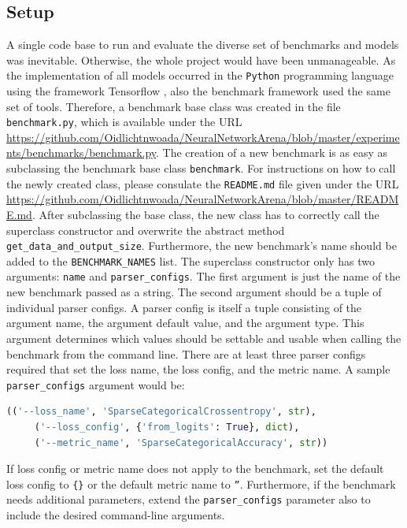 \documentclass[draft,final]{vutinfth} %
\begin{document}
    \subsection{Setup}
    A single code base to run and evaluate the diverse set of benchmarks and models was inevitable.
    Otherwise, the whole project would have been unmanageable.
    As the implementation of all models occurred in the \texttt{Python} programming language \cite{Python3} using the framework Tensorflow \cite{Tensorflow}, also the benchmark framework used the same set of tools.
    Therefore, a benchmark base class was created in the file \texttt{benchmark.py}, which is available under the URL \url{https://github.com/Oidlichtnwoada/NeuralNetworkArena/blob/master/experiments/benchmarks/benchmark.py}.
    The creation of a new benchmark is as easy as subclassing the benchmark base class \texttt{benchmark}.
    For instructions on how to call the newly created class, please consulate the \texttt{README.md} file given under the URL \url{https://github.com/Oidlichtnwoada/NeuralNetworkArena/blob/master/README.md}.
    After subclassing the base class, the new class has to correctly call the superclass constructor and overwrite the abstract method \texttt{get\_data\_and\_output\_size}.
    Furthermore, the new benchmark's name should be added to the \texttt{BENCHMARK\_NAMES} list.
    The superclass constructor only has two arguments: \texttt{name} and \texttt{parser\_configs}.
    The first argument is just the name of the new benchmark passed as a string.
    The second argument should be a tuple of individual parser configs.
    A parser config is itself a tuple consisting of the argument name, the argument default value, and the argument type.
    This argument determines which values should be settable and usable when calling the benchmark from the command line.
    There are at least three parser configs required that set the loss name, the loss config, and the metric name.
    A sample \texttt{parser\_configs} argument would be:
    \begin{lstlisting}[language=Python]
    (('--loss_name', 'SparseCategoricalCrossentropy', str), 
     ('--loss_config', {'from_logits': True}, dict), 
     ('--metric_name', 'SparseCategoricalAccuracy', str))
    \end{lstlisting}
    If loss config or metric name does not apply to the benchmark, set the default loss config to \texttt{\{\}} or the default metric name to \texttt{''}.
    Furthermore, if the benchmark needs additional parameters, extend the \texttt{parser\_configs} parameter also to include the desired command-line arguments.
\end{document}

